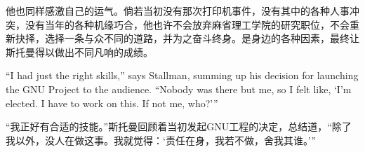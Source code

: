 \ifdefined\chs
他也同样感激自己的运气。倘若当初没有那次打印机事件，没有其中的各种人事冲突，没有当年的各种机缘巧合，他也许不会放弃麻省理工学院的研究职位，不会重新抉择，选择一条与众不同的道路，并为之奋斗终身。是身边的各种因素，最终让斯托曼得以做出不同凡响的成绩。
\fi

\ifdefined\eng
``I had just the right skills,'' says Stallman, summing up his decision for launching the GNU Project to the audience. ``Nobody was there but me, so I felt like, `I'm elected. I have to work on this. If not me, who?'\hspace{0.01in}''
\fi

\ifdefined\chs
“我正好有合适的技能。”斯托曼回顾着当初发起GNU工程的决定，总结道，“除了我以外，没人在做这事。我就觉得：‘责任在身，我若不做，舍我其谁。’”
\fi

\theendnotes
\setcounter{endnote}{0}
